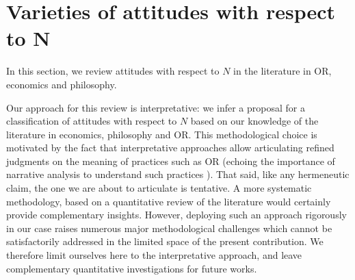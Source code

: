 \documentclass[preprint, french, english, 11pt, authoryear]{elsarticle}%
\newcommand{\protectforpdf}[1]{\texorpdfstring{\ensuremath{#1}}{#1}}
\begin{document}
\section{Varieties of attitudes with respect to N}%
\label{sec:existing}
In this section, we review attitudes with respect to $N$ in the literature in \ac{OR}, economics and philosophy.
\begin{changebar}
Our approach for this review is interpretative: we infer a proposal for a classification of attitudes with respect to $N$ based on our knowledge of the literature in economics, philosophy and \ac{OR}. This methodological choice is motivated by the fact that interpretative approaches allow articulating refined judgments on the meaning of practices such as \ac{OR} (echoing the importance of narrative analysis to understand such practices \citep{white_death_1994}).
That said, like any hermeneutic claim, the one we are about to articulate is tentative. %
A more systematic methodology, based on a quantitative review of the literature would certainly provide complementary insights. 
However, deploying such an approach rigorously in our case raises numerous major methodological challenges which cannot be satisfactorily addressed in the limited space of the present contribution.
We therefore limit ourselves here to the interpretative approach, and leave complementary quantitative investigations for future works. 



\end{changebar}
\end{document}
